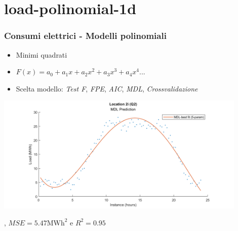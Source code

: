 \documentclass{beamer}
\begin{document}
\section{load-polinomial-1d}
\begin{frame}
    \frametitle{Consumi elettrici - Modelli polinomiali}
    \vfill    
    \begin{itemize}
        \item Minimi quadrati
        \item $F(x)=a_0+a_1x+a_2x^2+a_3x^3+a_4x^4...$        
        \item Scelta modello: 
            \textit{Test F}, 
            \textit{FPE}, 
            \textit{AIC}, 
            \textit{MDL}, 
            \textit{Crossvalidazione}
    \end{itemize}
    \vfill
    \centering
    \includegraphics[width=0.9\textwidth,keepaspectratio]{2_i_q2_MDL_poli.png}     

    \scriptsize {}, $MSE=5.47\text{MWh}^2$ e $R^2=0.95$
\end{frame}
\end{document}
